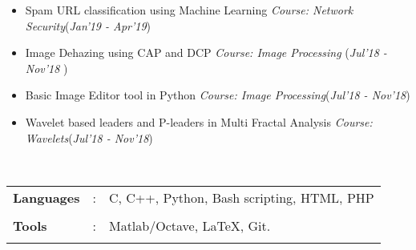 \documentclass[10pt]{article}
\newcommand\hs{1.3mm}        %
\begin{document}
\colorbox{bl}{}
\vspace{-0.55cm}

\begin{itemize}[leftmargin=0.4cm]
\vspace{-0.05cm}

    \item Spam URL classification using Machine Learning
 \textpipe \hspace{0.2cm} \textit{Course: Network Security}\hspace{2.7cm}(\textit{Jan'19 - Apr'19})\vspace{-0.25cm}

     \item Image Dehazing using CAP and DCP \textpipe \hspace{-0.1cm} \textit{Course: Image Processing} \hfill{(\textit{Jul’18 - Nov’18 })}\vspace{-0.25cm}

    \item Basic Image Editor tool in Python
  \textpipe \hspace{0.2cm} \textit{Course: Image Processing}\hspace{5.1cm}(\textit{Jul'18 - Nov'18})\vspace{-0.25cm}
    \item Wavelet based leaders and P-leaders in Multi Fractal Analysis \textpipe \hspace{0.2cm}  \textit{Course: Wavelets}\hspace{1.95cm}(\textit{Jul'18 - Nov'18})\vspace{-0.25cm}

\end{itemize}

\vspace{0.05cm}

\colorbox{bl}{}\\
\begin{tabular}{m{1in}m{0.20in}m{4.5in}}
    \\[-3mm]
    \hspace{\hs} \textbf{\textbf{Languages}} &: & {{C, C++, Python, Bash scripting, HTML, PHP}} \\
    \\[-3.5mm]
    \hspace{\hs} \textbf{\textbf{Tools}} &: & {Matlab/Octave, \LaTeX, Git.}\\
    \\[-4mm]
\end{tabular}\\
\end{document}
